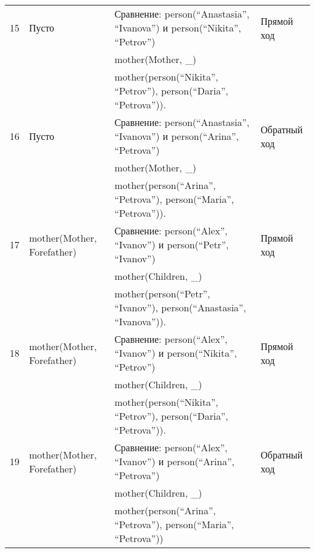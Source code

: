 {\begin{longtable}{|p{1.15cm}|p{4cm}|p{6cm}|p{6cm}|}
    \hline
    15 & Пусто & Сравнение: person(``Anastasia'', ``Ivanova'') и person(``Nikita'', ``Petrov'') & Прямой ход \\
      & & mother(Mother, \_) & \\
      & & mother(person(``Nikita'', ``Petrov''), person(``Daria'', ``Petrova'')). & \\
    \hline
    16 & Пусто & Сравнение: person(``Anastasia'', ``Ivanova'') и person(``Arina'', ``Petrova'') & Обратный ход \\
      & & mother(Mother, \_) & \\
      & & mother(person(``Arina'', ``Petrova''), person(``Maria'', ``Petrova'')).& \\
    \hline
    17 & mother(Mother, Forefather) & Сравнение: person(``Alex'', ``Ivanov'') и person(``Petr'', ``Ivanov'') & Прямой ход \\
      & & mother(Children, \_) & \\
      & & mother(person(``Petr'', ``Ivanov''), person(``Anastasia'', ``Ivanova'')). & \\
    \hline
    18 & mother(Mother, Forefather) & Сравнение: person(``Alex'', ``Ivanov'') и person(``Nikita'', ``Petrov'') & Прямой ход \\
      & & mother(Children, \_) & \\
      & & mother(person(``Nikita'', ``Petrov''), person(``Daria'', ``Petrova'')). & \\
    \hline
    19 & mother(Mother, Forefather) & Сравнение: person(``Alex'', ``Ivanov'') и person(``Arina'', ``Petrova'') & Обратный ход \\
      & & mother(Children, \_) & \\
      & & mother(person(``Arina'', ``Petrova''), person(``Maria'', ``Petrova'')) & \\
    \hline
\end{longtable}
}
